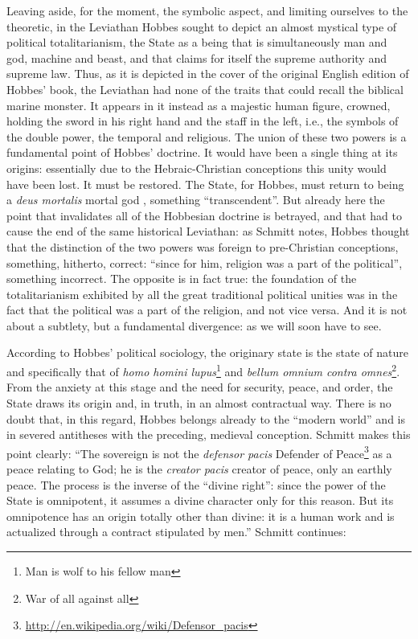 Leaving aside, for the moment, the symbolic aspect, and limiting ourselves to the theoretic, in the Leviathan Hobbes sought to depict an almost mystical type of political totalitarianism, the State as a being that is simultaneously man and god, machine and beast, and that claims for itself the supreme authority and supreme law. Thus, as it is depicted in the cover of the original English edition of Hobbes' book, the Leviathan had none of the traits that could recall the biblical marine monster. It appears in it instead as a majestic human figure, crowned, holding the sword in his right hand and the staff in the left, i.e., the symbols of the double power, the temporal and religious. The union of these two powers is a fundamental point of Hobbes' doctrine. It would have been a single thing at its origins: essentially due to the Hebraic-Christian conceptions this unity would have been lost. It must be restored. The State, for Hobbes, must return to being a \emph{deus mortalis} mortal god , something ``transcendent''. But already here the point that invalidates all of the Hobbesian doctrine is betrayed, and that had to cause the end of the same historical Leviathan: as Schmitt notes, Hobbes thought that the distinction of the two powers was foreign to pre-Christian conceptions, something, hitherto, correct: ``since for him, religion was a part of the political'', something incorrect. The opposite is in fact true: the foundation of the totalitarianism exhibited by all the great traditional political unities was in the fact that the political was a part of the religion, and not vice versa. And it is not about a subtlety, but a fundamental divergence: as we will soon have to see.

According to Hobbes' political sociology, the originary state is the state of nature and specifically that of \emph{homo homini lupus}\footnote{Man is wolf to his fellow man} and \emph{bellum omnium contra omnes}\footnote{War of all against all}. From the anxiety at this stage and the need for security, peace, and order, the State draws its origin and, in truth, in an almost contractual way. There is no doubt that, in this regard, Hobbes belongs already to the ``modern world'' and is in severed antitheses with the preceding, medieval conception. Schmitt makes this point clearly: ``The sovereign is not the \emph{defensor pacis} Defender of Peace\footnote{\url{http://en.wikipedia.org/wiki/Defensor\_pacis}} as a peace relating to God; he is the \emph{creator pacis} creator of peace, only an earthly peace. The process is the inverse of the ``divine right'': since the power of the State is omnipotent, it assumes a divine character only for this reason. But its omnipotence has an origin totally other than divine: it is a human work and is actualized through a contract stipulated by men.'' Schmitt continues:

